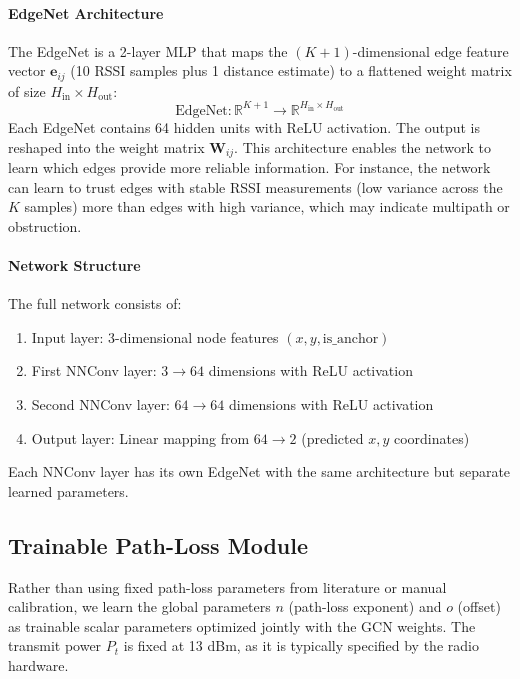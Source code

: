 \documentclass{ieeeaccess}
\begin{document}
\paragraph{EdgeNet Architecture}
The EdgeNet is a 2-layer MLP that maps the $(K{+}1)$-dimensional edge feature vector $\mathbf{e}_{ij}$ (10 RSSI samples plus 1 distance estimate) to a flattened weight matrix of size $H_{\text{in}} \times H_{\text{out}}$:
\begin{equation}
\text{EdgeNet}: \mathbb{R}^{K+1} \rightarrow \mathbb{R}^{H_{\text{in}} \times H_{\text{out}}}
\end{equation}
Each EdgeNet contains 64 hidden units with ReLU activation. The output is reshaped into the weight matrix $\mathbf{W}_{ij}$. This architecture enables the network to learn which edges provide more reliable information. For instance, the network can learn to trust edges with stable RSSI measurements (low variance across the $K$ samples) more than edges with high variance, which may indicate multipath or obstruction.

\paragraph{Network Structure}
The full network consists of:
\begin{enumerate}
    \item Input layer: 3-dimensional node features $(x, y, \text{is\_anchor})$
    \item First NNConv layer: $3 \rightarrow 64$ dimensions with ReLU activation
    \item Second NNConv layer: $64 \rightarrow 64$ dimensions with ReLU activation
    \item Output layer: Linear mapping from $64 \rightarrow 2$ (predicted $x, y$ coordinates)
\end{enumerate}
Each NNConv layer has its own EdgeNet with the same architecture but separate learned parameters.

\subsection{Trainable Path-Loss Module}
Rather than using fixed path-loss parameters from literature or manual calibration, we learn the global parameters $n$ (path-loss exponent) and $o$ (offset) as trainable scalar parameters optimized jointly with the GCN weights. The transmit power $P_t$ is fixed at 13 dBm, as it is typically specified by the radio hardware.
\end{document}
